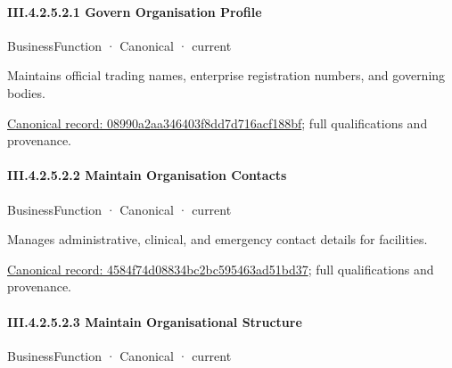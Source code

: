 \paragraph*{III.4.2.5.2.1 Govern Organisation Profile}
\label{navigation:III.4.2.5.2.1}

\label{element:08990a2aa346403f8dd7d716acf188bf}
{\small BusinessFunction · Canonical · current}\par

Maintains official trading names, enterprise registration numbers, and governing bodies.


{\footnotesize \href{../../../../continuum/business/business-function/08990a2aa346403f8dd7d716acf188bf.md}{Canonical record: 08990a2aa346403f8dd7d716acf188bf}; full qualifications and provenance.}\par
\paragraph*{III.4.2.5.2.2 Maintain Organisation Contacts}
\label{navigation:III.4.2.5.2.2}

\label{element:4584f74d08834bc2bc595463ad51bd37}
{\small BusinessFunction · Canonical · current}\par

Manages administrative, clinical, and emergency contact details for facilities.


{\footnotesize \href{../../../../continuum/business/business-function/4584f74d08834bc2bc595463ad51bd37.md}{Canonical record: 4584f74d08834bc2bc595463ad51bd37}; full qualifications and provenance.}\par
\paragraph*{III.4.2.5.2.3 Maintain Organisational Structure}
\label{navigation:III.4.2.5.2.3}

\label{element:5ae4edf0813f4a738fdb3160f3e77b0d}
{\small BusinessFunction · Canonical · current}\par

